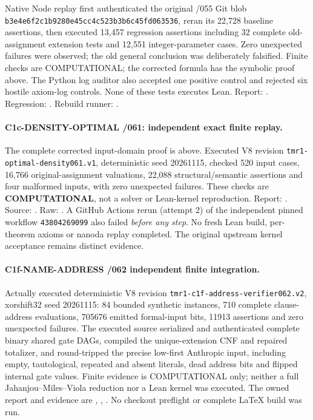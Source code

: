 \documentclass[11pt]{article}
\begin{document}
Native Node replay first authenticated the original /055 Git blob
\texttt{b3e4e6f2c1b9280e45cc4c523b3b6c45fd063536}, reran its
22,728 baseline assertions, then executed 13,457 regression assertions
including 32 complete old-assignment extension tests and 12,551
integer-parameter cases. Zero unexpected failures were observed;
the old general conclusion was deliberately falsified. Finite checks
are COMPUTATIONAL; the corrected formula has the symbolic proof above.
The Python log auditor also accepted one positive control and rejected
six hostile axiom-log controls. None of these tests executes Lean.
Report: .
Regression: .
Rebuild runner: .

\paragraph{C1c-DENSITY-OPTIMAL /061: independent exact finite replay.}
The complete corrected input-domain proof is above. Executed V8
revision \texttt{tmr1-optimal-density061.v1}, deterministic
seed 20261115, checked 520 input cases, 16,766 original-assignment
valuations, 22,088 structural/semantic assertions and four malformed
inputs, with zero unexpected failures. These checks are
\textbf{COMPUTATIONAL}, not a solver or Lean-kernel reproduction.
Report: .
Source: .
Raw: .
A GitHub Actions rerun (attempt 2) of the independent pinned
workflow \texttt{43804269099} also failed \emph{before any step}.
No fresh Lean build, per-theorem axioms or nanoda replay completed.
The original upstream kernel acceptance remains distinct evidence.


\paragraph{C1f-NAME-ADDRESS /062 independent finite integration.}
Actually executed deterministic V8 revision
\texttt{tmr1-c1f-address-verifier062.v2},
xorshift32 seed 20261115: 84 bounded synthetic
instances, 710 complete clause-address evaluations,
705676 emitted formal-input bits, 11913 assertions
and zero unexpected failures. The executed source
serialized and authenticated complete binary shared
gate DAGs, compiled the unique-extension CNF and
repaired totalizer, and round-tripped the precise
low-first Anthropic input, including empty, tautological,
repeated and absent literals, dead address bits
and flipped internal gate values. Finite evidence
is COMPUTATIONAL only; neither a full Jahanjou--Miles--Viola
reduction nor a Lean kernel was executed. The owned
report and evidence are
,
,
.
No checkout preflight or complete LaTeX build was run.
\end{document}
